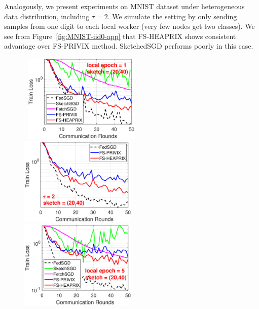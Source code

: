 \documentclass{article}
\begin{document}
Analogously, we present experiments on MNIST dataset under heterogeneous data distribution, including $\tau=2$. We simulate the setting by only sending samples from one digit to each local worker (very few nodes get two classes). We see from Figure~\ref{fig:MNIST-iid0-app} that FS-HEAPRIX shows consistent advantage over FS-PRIVIX method. SketchedSGD performs poorly in this case.

\begin{figure}[H]
	\begin{center}
		\mbox{\hspace{-0.15in}			   
		\includegraphics[width=2.2in]{MNIST_figures/local1_sketch20_iid0_train_loss.eps} \hspace{-0.15in}
		\includegraphics[width=2.2in]{MNIST_figures/local2_sketch20_iid0_train_loss.eps} \hspace{-0.15in}
		\includegraphics[width=2.2in]{MNIST_figures/local5_sketch20_iid0_train_loss.eps} }
		

\end{center}
\end{figure}
\end{document}
